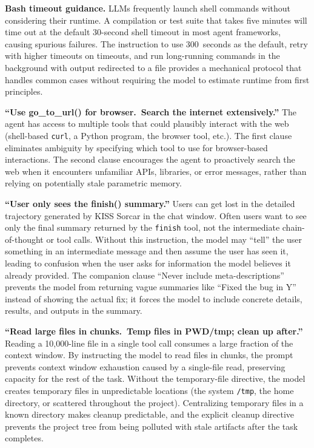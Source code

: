 \documentclass{article}
\begin{document}
\textbf{Bash timeout guidance.}  LLMs frequently launch shell commands without considering their runtime.  A compilation or test suite that takes five minutes will time out at the default 30-second shell timeout in most agent frameworks, causing spurious failures.  The instruction to use 300~seconds as the default, retry with higher timeouts on timeouts, and run long-running commands in the background with output redirected to a file provides a mechanical protocol that handles common cases without requiring the model to estimate runtime from first principles.

\textbf{``Use go\_to\_url() for browser.\ Search the internet extensively.''}  The agent has access to multiple tools that could plausibly interact with the web (shell-based \texttt{curl}, a Python program, the browser tool, etc.).  The first clause eliminates ambiguity by specifying which tool to use for browser-based interactions.  The second clause encourages the agent to proactively search the web when it encounters unfamiliar APIs, libraries, or error messages, rather than relying on potentially stale parametric memory.

\textbf{``User only sees the finish() summary.''}  Users can get lost in the detailed trajectory generated by KISS Sorcar in the chat window.  Often users want to see only the final summary returned by the \texttt{finish} tool, not the intermediate chain-of-thought or tool calls.  Without this instruction, the model may ``tell'' the user something in an intermediate message and then assume the user has seen it, leading to confusion when the user asks for information the model believes it already provided.  The companion clause ``Never include meta-descriptions'' prevents the model from returning vague summaries like ``Fixed the bug in Y'' instead of showing the actual fix; it forces the model to include concrete details, results, and outputs in the summary.

\textbf{``Read large files in chunks.\ Temp files in PWD/tmp; clean up after.''}  Reading a 10,000-line file in a single tool call consumes a large fraction of the context window.  By instructing the model to read files in chunks, the prompt prevents context window exhaustion caused by a single-file read, preserving capacity for the rest of the task.  Without the temporary-file directive, the model creates temporary files in unpredictable locations (the system \texttt{/tmp}, the home directory, or scattered throughout the project).  Centralizing temporary files in a known directory makes cleanup predictable, and the explicit cleanup directive prevents the project tree from being polluted with stale artifacts after the task completes.
\end{document}
